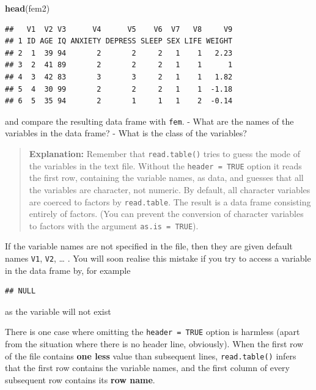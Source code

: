 \documentclass[
]{book}
\newenvironment{Shaded}{\begin{snugshade}}{\end{snugshade}}
\newcommand{\FunctionTok}[1]{\textcolor[rgb]{0.13,0.29,0.53}{\textbf{#1}}}
\newcommand{\NormalTok}[1]{#1}
\newcommand{\SpecialCharTok}[1]{\textcolor[rgb]{0.81,0.36,0.00}{\textbf{#1}}}
\theoremstyle{definition}
\theoremstyle{definition}
\theoremstyle{definition}
\theoremstyle{definition}
\theoremstyle{remark}
\begin{document}
\begin{Shaded}
\begin{Highlighting}[]
\FunctionTok{head}\NormalTok{(fem2)}
\end{Highlighting}
\end{Shaded}

\begin{verbatim}
##   V1  V2 V3      V4      V5    V6  V7   V8     V9
## 1 ID AGE IQ ANXIETY DEPRESS SLEEP SEX LIFE WEIGHT
## 2  1  39 94       2       2     2   1    1   2.23
## 3  2  41 89       2       2     2   1    1      1
## 4  3  42 83       3       3     2   1    1   1.82
## 5  4  30 99       2       2     2   1    1  -1.18
## 6  5  35 94       2       1     1   1    2  -0.14
\end{verbatim}

and compare the resulting data frame with \texttt{fem}.
- What are the names of the variables in the data frame?
- What is the class of the variables?

\begin{quote}
\textbf{Explanation:} Remember that \texttt{read.table()} tries to guess
the mode of the variables in the text file. Without the
\texttt{header\ =\ TRUE} option it reads the first row, containing the
variable names, as data, and guesses that all the variables are
character, not numeric. By default, all character variables are
coerced to factors by \texttt{read.table}. The result is a data frame
consisting entirely of factors. (You can prevent the conversion of
character variables to factors with the argument \texttt{as.is\ =\ TRUE}).
\end{quote}

If the variable names are not specified in the file, then they are
given default names \texttt{V1}, \texttt{V2}, \ldots{} . You will soon realise this
mistake if you try to access a variable in the data frame by, for
example

\begin{Shaded}
\end{Shaded}

\begin{verbatim}
## NULL
\end{verbatim}

as the variable will not exist

There is one case where omitting the \texttt{header\ =\ TRUE} option is
harmless (apart from the situation where there is no header line,
obviously). When the first row of the file contains \textbf{one less}
value than subsequent lines, \texttt{read.table()} infers that the first
row contains the variable names, and the first column of every
subsequent row contains its \textbf{row name}.
\end{document}

